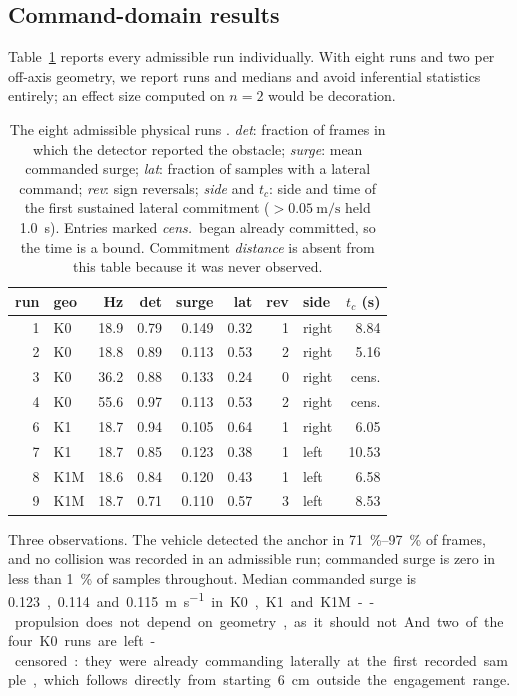 \subsection{Command-domain results}

Table~\ref{tab:real} reports every admissible run individually. With
eight runs and two per off-axis geometry, we report runs and medians and
avoid inferential statistics entirely; an effect size computed on $n=2$
would be decoration.

\begin{table}[t]
\centering
\caption{The eight admissible physical runs \realmark. \emph{det}:
fraction of frames in which the detector reported the obstacle;
\emph{surge}: mean commanded surge; \emph{lat}: fraction of samples with
a lateral command; \emph{rev}: sign reversals; \emph{side} and $t_c$:
side and time of the first sustained lateral commitment
($>\SI{0.05}{\metre\per\second}$ held \SI{1.0}{\second}). Entries marked
\emph{cens.}\ began already committed, so the time is a bound.
Commitment \emph{distance} is absent from this table because it was
never observed.}
\label{tab:real}
\begin{tabular}{rlrrrrrlr}
\toprule
run & geo & Hz & det & surge & lat & rev & side & $t_c$ (\si{\second}) \\
\midrule
1 & K0  & 18.9 & 0.79 & 0.149 & 0.32 & 1 & right & 8.84 \\
2 & K0  & 18.8 & 0.89 & 0.113 & 0.53 & 2 & right & 5.16 \\
3 & K0  & 36.2 & 0.88 & 0.133 & 0.24 & 0 & right & cens. \\
4 & K0  & 55.6 & 0.97 & 0.113 & 0.53 & 2 & right & cens. \\
6 & K1  & 18.7 & 0.94 & 0.105 & 0.64 & 1 & right & 6.05 \\
7 & K1  & 18.7 & 0.85 & 0.123 & 0.38 & 1 & left  & 10.53 \\
8 & K1M & 18.6 & 0.84 & 0.120 & 0.43 & 1 & left  & 6.58 \\
9 & K1M & 18.7 & 0.71 & 0.110 & 0.57 & 3 & left  & 8.53 \\
\bottomrule
\end{tabular}
\end{table}

Three observations. The vehicle detected the anchor in
\SIrange{71}{97}{\percent} of frames, and no collision was recorded in
an admissible run; commanded surge is zero in less than
\SI{1}{\percent} of samples throughout. Median commanded surge is
\SI{0.123}, \SI{0.114} and \SI{0.115}{\metre\per\second} in
\textsf{K0}, \textsf{K1} and \textsf{K1M} -- propulsion does not depend
on geometry, as it should not. And two of the four \textsf{K0} runs
are left-censored: they were already commanding laterally at the first
recorded sample, which follows directly from starting
\SI{6}{\centi\metre} outside the engagement range.


